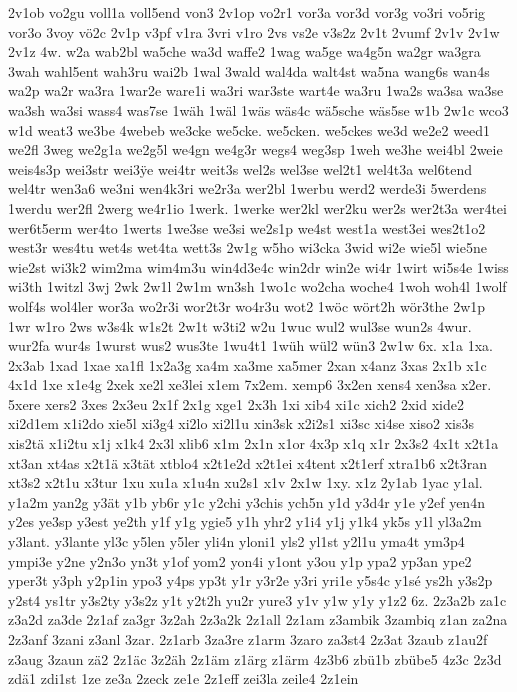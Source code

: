 {2v1ob
vo2gu
voll1a
voll5end
von3
2v1op
vo2r1
vor3a
vor3d
vor3g
vo3ri
vo5rig
vor3o
3voy
vö2c
2v1p
v3pf
v1ra
3vri
v1ro
2vs
vs2e
v3s2z
2v1t
2vumf
2v1v
2v1w
2v1z
4w.
w2a
wab2bl
wa5che
wa3d
waffe2
1wag
wa5ge
wa4g5n
wa2gr
wa3gra
3wah
wahl5ent
wah3ru
wai2b
1wal
3wald
wal4da
walt4st
wa5na
wang6s
wan4s
wa2p
wa2r
wa3ra
1war2e
ware1i
wa3ri
war3ste
wart4e
wa3ru
1wa2s
wa3sa
wa3se
wa3sh
wa3si
wass4
was7se
1wäh
1wäl
1wäs
wäs4c
wä5sche
wäs5se
w1b
2w1c
wco3
w1d
weat3
we3be
4webeb
we3cke
we5cke.
we5cken.
we5ckes
we3d
we2e2
weed1
we2fl
3weg
we2g1a
we2g5l
we4gn
we4g3r
wegs4
weg3sp
1weh
we3he
wei4bl
2weie
weis4s3p
wei3str
wei3^^ffe
wei4tr
weit3s
wel2s
wel3se
wel2t1
wel4t3a
wel6tend
wel4tr
wen3a6
we3ni
wen4k3ri
we2r3a
wer2bl
1werbu
werd2
werde3i
5werdens
1werdu
wer2fl
2werg
we4r1io
1werk.
1werke
wer2kl
wer2ku
wer2s
wer2t3a
wer4tei
wer6t5erm
wer4to
1werts
1we3se
we3si
we2s1p
we4st
west1a
west3ei
wes2t1o2
west3r
wes4tu
wet4s
wet4ta
wett3s
2w1g
w5ho
wi3cka
3wid
wi2e
wie5l
wie5ne
wie2st
wi3k2
wim2ma
wim4m3u
win4d3e4c
win2dr
win2e
wi4r
1wirt
wi5s4e
1wiss
wi3th
1witzl
3wj
2wk
2w1l
2w1m
wn3sh
1wo1c
wo2cha
woche4
1woh
woh4l
1wolf
wolf4s
wol4ler
wor3a
wo2r3i
wor2t3r
wo4r3u
wot2
1wöc
wört2h
wör3the
2w1p
1wr
w1ro
2ws
w3s4k
w1s2t
2w1t
w3ti2
w2u
1wuc
wul2
wul3se
wun2s
4wur.
wur2fa
wur4s
1wurst
wus2
wus3te
1wu4t1
1wüh
wül2
wün3
2w1w
6x.
x1a
1xa.
2x3ab
1xad
1xae
xa1fl
1x2a3g
xa4m
xa3me
xa5mer
2xan
x4anz
3xas
2x1b
x1c
4x1d
1xe
x1e4g
2xek
xe2l
xe3lei
x1em
7x2em.
xemp6
3x2en
xens4
xen3sa
x2er.
5xere
xers2
3xes
2x3eu
2x1f
2x1g
xge1
2x3h
1xi
xib4
xi1c
xich2
2xid
xide2
xi2d1em
x1i2do
xie5l
xi3g4
xi2lo
xi2l1u
xin3sk
x2i2s1
xi3sc
xi4se
xiso2
xis3s
xis2tä
x1i2tu
x1j
x1k4
2x3l
xlib6
x1m
2x1n
x1or
4x3p
x1q
x1r
2x3s2
4x1t
x2t1a
xt3an
xt4as
x2t1ä
x3tät
xtblo4
x2t1e2d
x2t1ei
x4tent
x2t1erf
xtra1b6
x2t3ran
xt3s2
x2t1u
x3tur
1xu
xu1a
x1u4n
xu2s1
x1v
2x1w
1xy.
x1z
2y1ab
1yac
y1al.
y1a2m
yan2g
y3ät
y1b
yb6r
y1c
y2chi
y3chis
ych5n
y1d
y3d4r
y1e
y2ef
yen4n
y2es
ye3sp
y3est
ye2th
y1f
y1g
ygie5
y1h
yhr2
y1i4
y1j
y1k4
yk5s
y1l
yl3a2m
y3lant.
y3lante
yl3c
y5len
y5ler
yli4n
yloni1
yls2
yl1st
y2l1u
yma4t
ym3p4
ympi3e
y2ne
y2n3o
yn3t
y1of
yom2
yon4i
y1ont
y3ou
y1p
ypa2
yp3an
ype2
yper3t
y3ph
y2p1in
ypo3
y4ps
yp3t
y1r
y3r2e
y3ri
yri1e
y5s4c
y1sé
ys2h
y3s2p
y2st4
ys1tr
y3s2ty
y3s2z
y1t
y2t2h
yu2r
yure3
y1v
y1w
y1y
y1z2
6z.
2z3a2b
za1c
z3a2d
za3de
2z1af
za3gr
3z2ah
2z3a2k
2z1all
2z1am
z3ambik
3zambiq
z1an
za2na
2z3anf
3zani
z3anl
3zar.
2z1arb
3za3re
z1arm
3zaro
za3st4
2z3at
3zaub
z1au2f
z3aug
3zaun
zä2
2z1äc
3z2äh
2z1äm
z1ärg
z1ärm
4z3b6
zbü1b
zbübe5
4z3c
2z3d
zdä1
zdi1st
1ze
ze3a
2zeck
ze1e
2z1eff
zei3la
zeile4
2z1ein
}
